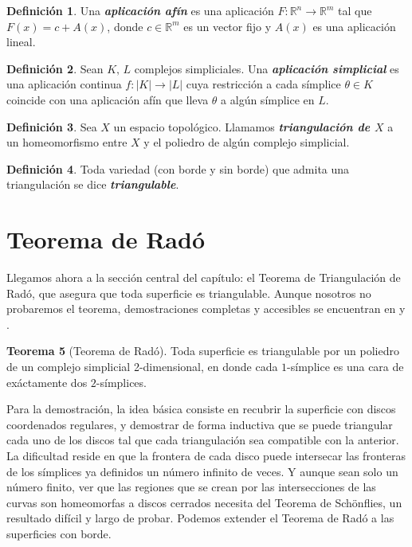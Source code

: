 \documentclass[10pt]{report}
\newcommand{\R}{\mathbb{R}}
\newcommand{\enfatiza}[1]{\textbf{\textit{#1}}}
\theoremstyle{definition}
\newtheorem{defin}{Definición}[section]
\newtheorem{tma}[defin]{Teorema}
\begin{document}
\begin{defin}
Una \enfatiza{aplicación afín} es una aplicación $F:\R^n \to \R^m$ tal que $F(x)=c+A(x)$, donde $c\in \R^m$ es un vector fijo y $A(x)$ es una aplicación lineal.
\end{defin}
\begin{defin}
Sean $K, \, L$ complejos simpliciales. Una \enfatiza{aplicación simplicial} es una aplicación continua $f:|K|\to |L|$ cuya restricción a cada símplice $\theta \in K$ coincide con una aplicación afín que lleva $\theta$ a algún símplice en $L$.
\end{defin}
\begin{defin}%
Sea $X$ un espacio topológico. Llamamos \enfatiza{triangulación de $X$} a un homeomorfismo entre $X$ y el poliedro de algún complejo simplicial.
\end{defin}

\begin{defin}%
Toda variedad (con borde y sin borde) que admita una triangulación se dice \enfatiza{triangulable}.
\end{defin}



\section{Teorema de Radó}
Llegamos ahora a la sección central del capítulo: el Teorema de Triangulación de Radó, que asegura que toda superficie es triangulable.  Aunque nosotros no probaremos el teorema, demostraciones completas y accesibles se encuentran en \cite{doylemorean} y \cite{thomassen}.\\

\begin{tma}[Teorema de Radó]
Toda superficie es triangulable por un poliedro de un complejo simplicial 2-dimensional, en donde cada $1$-símplice es una cara de exáctamente dos $2$-símplices.\label{teo:rado}
\end{tma}

Para la demostración, la idea básica consiste en recubrir la superficie con discos coordenados regulares, y demostrar de forma inductiva que se puede triangular cada uno de los discos tal que cada triangulación sea compatible con la anterior. La dificultad reside en que la frontera de cada disco puede intersecar las fronteras de los símplices ya definidos un número infinito de veces. Y aunque sean solo un número finito, ver que las regiones que se crean por las intersecciones de las curvas son homeomorfas a discos cerrados necesita del Teorema de Schönflies, un resultado difícil y largo de probar. Podemos extender el Teorema de Radó a las superficies con borde.
\end{document}
